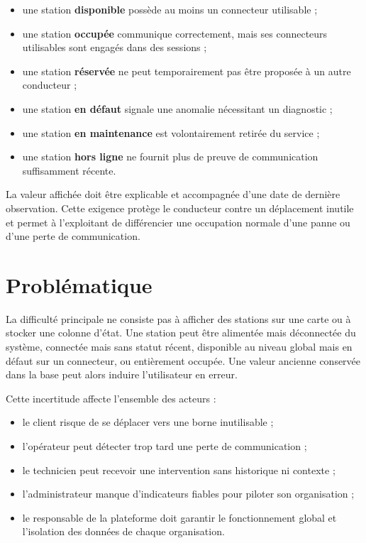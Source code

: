 \begin{itemize}[leftmargin=7mm]
  \item une station \textbf{disponible} possède au moins un connecteur utilisable ;
  \item une station \textbf{occupée} communique correctement, mais ses connecteurs
  utilisables sont engagés dans des sessions ;
  \item une station \textbf{réservée} ne peut temporairement pas être proposée à un
  autre conducteur ;
  \item une station \textbf{en défaut} signale une anomalie nécessitant un diagnostic ;
  \item une station \textbf{en maintenance} est volontairement retirée du service ;
  \item une station \textbf{hors ligne} ne fournit plus de preuve de communication
  suffisamment récente.
\end{itemize}

La valeur affichée doit être explicable et accompagnée d'une date de dernière
observation. Cette exigence protège le conducteur contre un déplacement inutile et
permet à l'exploitant de différencier une occupation normale d'une panne ou d'une
perte de communication.

\section{Problématique}

La difficulté principale ne consiste pas à afficher des stations sur une carte ou à
stocker une colonne d'état. Une station peut être alimentée mais déconnectée du
système, connectée mais sans statut récent, disponible au niveau global mais en défaut
sur un connecteur, ou entièrement occupée. Une valeur ancienne conservée dans la base
peut alors induire l'utilisateur en erreur.

Cette incertitude affecte l'ensemble des acteurs :

\begin{itemize}[leftmargin=7mm]
  \item le client risque de se déplacer vers une borne inutilisable ;
  \item l'opérateur peut détecter trop tard une perte de communication ;
  \item le technicien peut recevoir une intervention sans historique ni contexte ;
  \item l'administrateur manque d'indicateurs fiables pour piloter son organisation ;
  \item le responsable de la plateforme doit garantir le fonctionnement global et
  l'isolation des données de chaque organisation.
\end{itemize}

